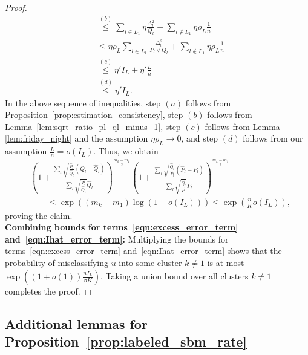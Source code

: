 \documentclass{article}
\begin{document}
\begin{proof}
\begin{align*}
%
&\stackrel{(b)} \leq \sum_{l \in L_1} \eta \frac{\Delta_l^2}{Q_l} + \sum_{l \notin L_1} \eta \rho_L \frac{1}{n} \\
%
&\leq \eta \rho_L \sum_{l \in L_1} \frac{\Delta_l^2}{P_l \vee Q_l} + \sum_{l \notin L_1} \eta \rho_L \frac{1}{n} \\
%
& \stackrel{(c)} \leq \eta' I_L + \eta' \frac{L}{n}  \\
%
&\stackrel{(d)}  \leq \eta' I_L.  
\end{align*}
In the above sequence of inequalities, step $(a)$ follows from Proposition~\ref{prop:estimation_consistency}, step $(b)$ follows from Lemma~\ref{lem:sqrt_ratio_pl_ql_minus_1}, step $(c)$ follows from Lemma \ref{lem:friday_night} and the assumption $\eta \rho_L \to 0$, and step $(d)$ follows from our assumption $\frac{L}{n} = o(I_L)$. Thus, we obtain
\begin{align*}
& \left( 1 + 
   \frac{\sum_l \sqrt{\frac{\hat{P}_l}{\hat{Q}_l}} (Q_l - \hat{Q}_l)}
        {\sum_l \sqrt{\frac{\hat{P}_l}{\hat{Q}_l}} \hat{Q}_l} 
     \right)^{\frac{m_k - m_1}{2}}
   \left( 1+ \frac{\sum_l \sqrt{\frac{\hat{Q}_l}{\hat{P}_l}} (\hat{P}_l - P_l)}
         {\sum_l \sqrt{\frac{\hat{Q}_l}{\hat{P}_l}} P_l } \right)^{\frac{m_k - m_1}{2}} \\
& \qquad \leq \exp\left( (m_k - m_1) \log(1 + o(I_L) ) \right) \leq \exp \left( \frac{n}{K} o(I_L) \right) ,
\end{align*}
proving the claim.\\

\noindent \textbf{Combining bounds for  terms~\eqref{eqn:excess_error_term} and~\eqref{eqn:Ihat_error_term}:}  Multiplying the bounds for terms~\eqref{eqn:excess_error_term} and~\eqref{eqn:Ihat_error_term} shows that the probability of misclassifying $u$ into some cluster $k \neq 1$ is at most $\exp\left((1 + o(1)) \frac{nI_L}{\beta K} \right)$. Taking a union bound over all clusters $k \neq 1$ completes the proof.
\end{proof}


\subsection{Additional lemmas for Proposition~\ref{prop:labeled_sbm_rate}}
\label{appendix: lemmas for labeled_sbm_rate}
\end{document}
